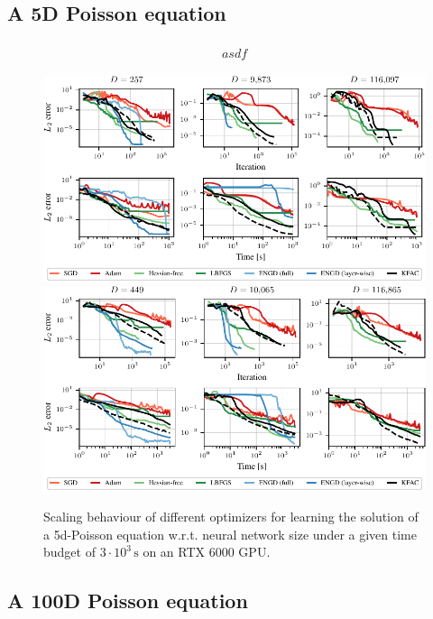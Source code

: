 \subsection{A 5D Poisson equation}

\begin{align}
    \begin{split}
        asdf
    \end{split}
\end{align}

\begin{figure}[tb]
  \centering
  \includegraphics{../kfac_pinns_exp/exp17_groupplot_poisson2d/l2_error.pdf}
  \includegraphics{../kfac_pinns_exp/exp18_groupplot_poisson5d/l2_error.pdf}
  \caption{Scaling behaviour of different optimizers for learning the solution of a 5d-Poisson equation w.r.t.
    neural network size under a given time budget of $3\cdot 10^3\,\text{s}$ on an RTX 6000 GPU.}
  \label{fig:pedagogical-example}
\end{figure}

\subsection{A 100D Poisson equation}

